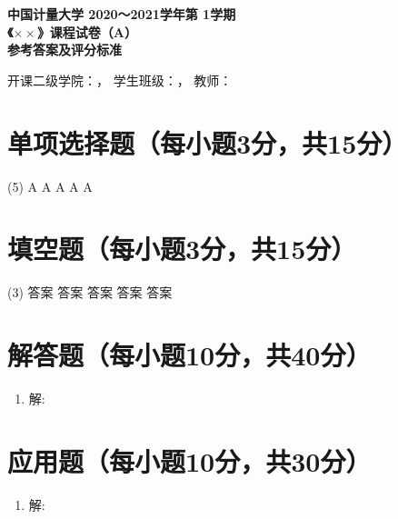 \documentclass[AutoFakeBold=2.85]{article}
\def\Year{2020～2021}       %
\def\Semester{1}            %
\def\Course{$\times\times$} %
\def\Type{A}                %
\def\School{$\times\times$} %
\def\Class{}                %
\def\Teacher{}              %
\renewcommand{\maketitle}{\bgroup
  \parindent0pt\linespread{1.5}\zihao{-4}%
  \begin{center}
    \zihao{4}\bfseries\fangsong
    中国计量大学 \Year 学年第 \Semester 学期\\
    《\Course》课程试卷（\Type）\\
    参考答案及评分标准
  \end{center}%
  开课二级学院：\underline{\makebox[8em][c]{\School}}，
  学生班级：\underline{\makebox[6em][c]{\Class}}，
  教师：\underline{\makebox[6em][c]{\Teacher}}
\egroup}
\begin{document}
\maketitle

\section{单项选择题（每小题3分，共15分）}

\begin{tasks}(5)
  \task A
  \task A
  \task A
  \task A
  \task A
\end{tasks}

\section{填空题（每小题3分，共15分）}

\begin{tasks}(3)
  \task 答案
  \task 答案
  \task 答案
  \task 答案
  \task 答案
\end{tasks}

\section{解答题（每小题10分，共40分）}

\begin{enumerate}
  \item 解:
\end{enumerate}

\section{应用题（每小题10分，共30分）}

\begin{enumerate}
  \item 解:
\end{enumerate}
\end{document}
